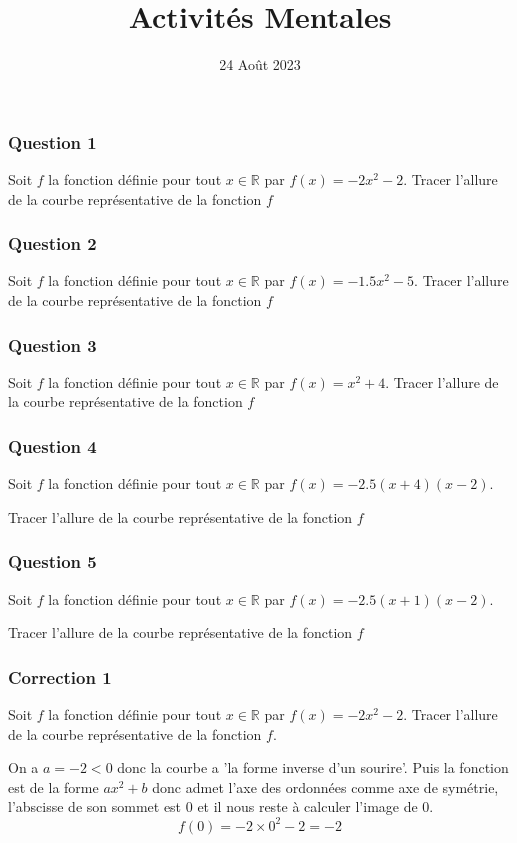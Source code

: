 \documentclass[15pt, mathserif]{beamer}
\title{Activités Mentales}
\date{24 Août 2023}
\newcommand{\R}{\mathbb{R}}			%
\begin{document}
\begin{frame}
    \titlepage
\end{frame}

\begin{frame} 
	\frametitle{Question 1}
 Soit $f$ la fonction définie pour tout $x \in \R$ par $f(x)=-2x^2-2$. Tracer l'allure de la courbe représentative de la fonction $f$\end{frame}


\begin{frame} 
	\frametitle{Question 2}
 Soit $f$ la fonction définie pour tout $x \in \R$ par $f(x)=-1.5x^2-5$. Tracer l'allure de la courbe représentative de la fonction $f$\end{frame}


\begin{frame} 
	\frametitle{Question 3}
 Soit $f$ la fonction définie pour tout $x \in \R$ par $f(x)=x^2+4$. Tracer l'allure de la courbe représentative de la fonction $f$\end{frame}


\begin{frame} 
	\frametitle{Question 4}
 Soit $f$ la fonction définie pour tout $x \in \R$ par $f(x)=-2.5(x+4)(x-2)$. 
 
  Tracer l'allure de la courbe représentative de la fonction $f$\end{frame}


\begin{frame} 
	\frametitle{Question 5}
 Soit $f$ la fonction définie pour tout $x \in \R$ par $f(x)=-2.5(x+1)(x-2)$. 
 
  Tracer l'allure de la courbe représentative de la fonction $f$\end{frame}


\begin{frame}
\vspace{-10mm}
	\frametitle{Correction 1}
\vspace*{1cm} 
 Soit $f$ la fonction définie pour tout $x \in \R$ par $f(x)=-2x^2 -2$. Tracer l'allure de la courbe représentative de la fonction $f$. 
 
 \begin{multicols}{2} 
 On a $a=-2<0$ donc la courbe a 'la forme inverse d'un sourire'. Puis la fonction est de la forme $ax^2+b$ donc admet l'axe des ordonnées comme axe de symétrie, l'abscisse de son sommet est 0 et il nous reste à calculer l'image de 0. $$f(0)= -2\times 0^2-2=-2$$ 
 
  \columnbreak  
 
 \end{multicols} 
 \end{frame}
\end{document}
